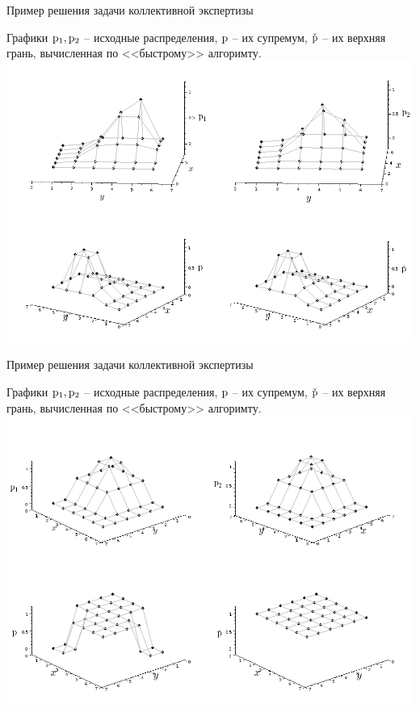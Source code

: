 \begin{frame}{Пример решения задачи  коллективной экспертизы}
  \vspace{-2ex}
  \begin{center}
    Графики ${\mathrm{p}}_1, {\mathrm{p}}_2$ -- исходные распределения, ${\mathrm{p}}$ -- их супремум, $\check{{\mathrm{p}}}$ -- их верхняя грань, вычисленная по <<быстрому>> алгоримту.
      \vspace{-1ex}
    \includegraphics[width=0.8\linewidth]{./pic/myplot_sovp}
  \end{center} 
\end{frame} %

\begin{frame}{Пример решения задачи  коллективной экспертизы}
  \vspace{-2ex}
  \begin{center}
    Графики ${\mathrm{p}}_1, {\mathrm{p}}_2$ -- исходные распределения, ${\mathrm{p}}$ -- их супремум, $\check{{\mathrm{p}}}$ -- их верхняя грань, вычисленная по <<быстрому>> алгоримту.
      \vspace{-1ex}
    \includegraphics[width=0.8\linewidth]{./pic/mytest}
  \end{center} 
\end{frame} %
